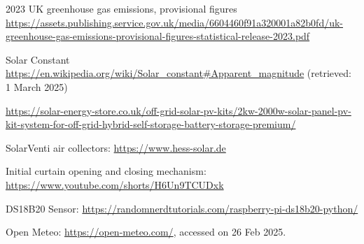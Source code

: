 \documentclass[a4paper,12pt]{article}
\begin{document}
\begin{thebibliography}{99}

     2023 UK greenhouse gas emissions, provisional figures \url{https://assets.publishing.service.gov.uk/media/6604460f91a320001a82b0fd/uk-greenhouse-gas-emissions-provisional-figures-statistical-release-2023.pdf}

     Solar Constant \url{https://en.wikipedia.org/wiki/Solar\_constant\#Apparent\_magnitude} (retrieved: 1 March 2025)

     \url{https://solar-energy-store.co.uk/off-grid-solar-pv-kits/2kw-2000w-solar-panel-pv-kit-system-for-off-grid-hybrid-self-storage-battery-storage-premium/}

     SolarVenti air collectors: \url{https://www.hess-solar.de}

     Initial curtain opening and closing mechanism: \url{https://www.youtube.com/shorts/H6Un9TCUDxk}

     DS18B20 Sensor: \url{https://randomnerdtutorials.com/raspberry-pi-ds18b20-python/}

     Open Meteo: \url{https://open-meteo.com/}, accessed on 26 Feb 2025.
        
\end{thebibliography}
\end{document}
